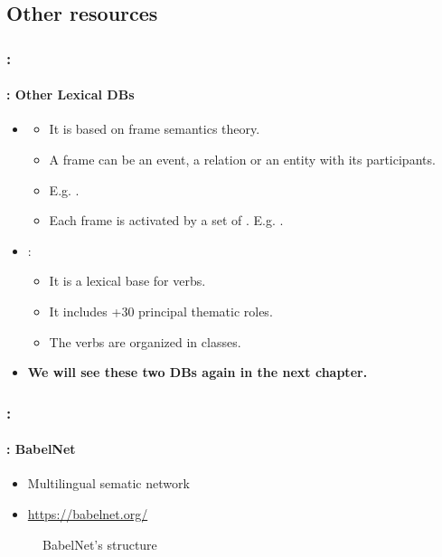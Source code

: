\documentclass[xcolor=table]{beamer}
\begin{document}
\subsection{Other resources}

\begin{frame}
	\frametitle{\insertshortsubtitle: \insertsection}
	\framesubtitle{\insertsubsection: Other Lexical DBs}
	
	\begin{itemize}
		\item {} 
		\begin{itemize}
			\item It is based on frame semantics theory.
			\item A frame can be an event, a relation or an entity with its participants.
			\item E.g. .
			\item Each frame is activated by a set of . E.g. .
		\end{itemize}
		\item {}:
		\begin{itemize}
			\item It is a lexical base for verbs.
			\item It includes +30 principal thematic roles.
			\item The verbs are organized in classes.
		\end{itemize}
		\item \textbf{We will see these two DBs again in the next chapter.}
	\end{itemize}
	
\end{frame}

\begin{frame}
	\frametitle{\insertshortsubtitle: \insertsection}
	\framesubtitle{\insertsubsection: BabelNet}

	\begin{itemize}
		\item Multilingual sematic network
		\item \url{https://babelnet.org/}
	\end{itemize}
	
	\begin{figure}
		\caption{BabelNet's structure \cite{2012-navigli-ponzetto}}
	\end{figure}
	
\end{frame}
\end{document}
